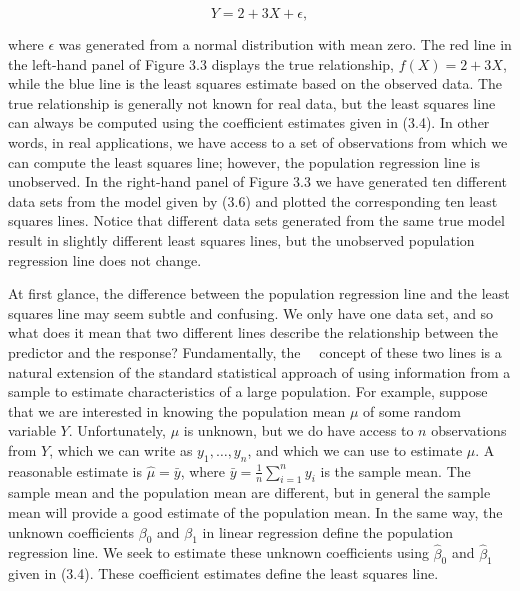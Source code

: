 \documentclass[10pt]{article}
\begin{document}
\begin{equation*}
Y=2+3 X+\epsilon, \tag{3.6}
\end{equation*}


where $\epsilon$ was generated from a normal distribution with mean zero. The red line in the left-hand panel of Figure 3.3 displays the true relationship, $f(X)=2+3 X$, while the blue line is the least squares estimate based on the observed data. The true relationship is generally not known for real data, but the least squares line can always be computed using the coefficient estimates given in (3.4). In other words, in real applications, we have access to a set of observations from which we can compute the least squares line; however, the population regression line is unobserved. In the right-hand panel of Figure 3.3 we have generated ten different data sets from the model given by (3.6) and plotted the corresponding ten least squares lines. Notice that different data sets generated from the same true model result in slightly different least squares lines, but the unobserved population regression line does not change.

At first glance, the difference between the population regression line and the least squares line may seem subtle and confusing. We only have one data set, and so what does it mean that two different lines describe the relationship between the predictor and the response? Fundamentally, the\
\
concept of these two lines is a natural extension of the standard statistical approach of using information from a sample to estimate characteristics of a large population. For example, suppose that we are interested in knowing the population mean $\mu$ of some random variable $Y$. Unfortunately, $\mu$ is unknown, but we do have access to $n$ observations from $Y$, which we can write as $y_{1}, \ldots, y_{n}$, and which we can use to estimate $\mu$. A reasonable estimate is $\hat{\mu}=\bar{y}$, where $\bar{y}=\frac{1}{n} \sum_{i=1}^{n} y_{i}$ is the sample mean. The sample mean and the population mean are different, but in general the sample mean will provide a good estimate of the population mean. In the same way, the unknown coefficients $\beta_{0}$ and $\beta_{1}$ in linear regression define the population regression line. We seek to estimate these unknown coefficients using $\hat{\beta}_{0}$ and $\hat{\beta}_{1}$ given in (3.4). These coefficient estimates define the least squares line.
\end{document}
